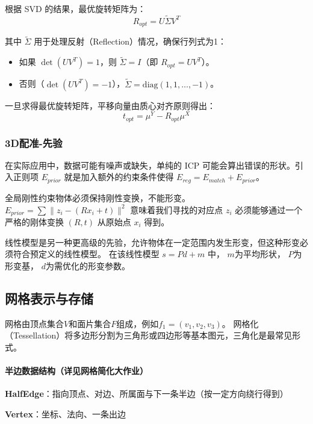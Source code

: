 \documentclass[12pt]{article}
\begin{document}
根据 SVD 的结果，最优旋转矩阵为：
\begin{equation}
    R_{opt} = U \tilde{\Sigma} V^T
\end{equation}

其中 $\tilde{\Sigma}$ 用于处理反射（Reflection）情况，确保行列式为1：
\begin{itemize}
    \item 如果 $\det(UV^T) = 1$，则 $\tilde{\Sigma} = I$（即 $R_{opt} = UV^T$）。
    \item 否则（$\det(UV^T) = -1$），$\tilde{\Sigma} = \text{diag}(1, 1, …, -1)$。
\end{itemize}

一旦求得最优旋转矩阵，平移向量由质心对齐原则得出：
\begin{equation}
    t_{opt} = \mu^Y - R_{opt} \mu^X
\end{equation}

\subsubsection{3D配准-先验}

在实际应用中，数据可能有噪声或缺失，单纯的 ICP 可能会算出错误的形状。引入正则项 $E_{prior}$ 就是加入额外的约束条件使得
$E_{reg} = E_{match} + E_{prior}$。

全局刚性约束物体必须保持刚性变换，不能形变。
$E_{prior} = \sum \| z_i - (R x_i + t) \|^2$ 意味着我们寻找的对应点 $z_i$ 必须能够通过一个严格的刚体变换 $(R, t)$ 从原始点 $x_i$ 得到。

线性模型是另一种更高级的先验，允许物体在一定范围内发生形变，但这种形变必须符合预定义的线性模型。
在该线性模型 $ s = P d + m $ 中， $m$为平均形状， $P$为形变基， $d$为需优化的形变参数。

\subsection{网格表示与存储}

网格由顶点集合$V$和面片集合$F$组成，例如$f_1 = (v_1, v_2, v_3)$。
网格化（Tessellation）将多边形分割为三角形或四边形等基本图元，三角化是最常见形式。

\paragraph{半边数据结构（详见网格简化大作业）}

    \textbf{HalfEdge}：指向顶点、对边、所属面与下一条半边（按一定方向绕行得到）

    \textbf{Vertex}：坐标、法向、一条出边
    
\end{document}
